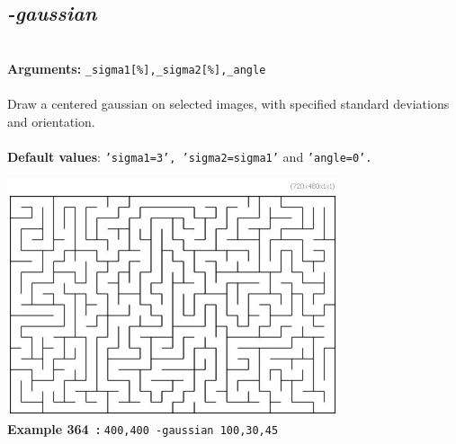 \documentclass[a4paper,11pt,twoside]{book}
\begin{document}
\subsection{\emph{-gaussian} }\vspace*{-0.5em}
~\\\textbf{Arguments: } 
{\small \texttt{\_sigma1[\%],\_sigma2[\%],\_angle}}\\~\\
Draw a centered gaussian on selected images, with specified standard deviations and orientation.
~\\~\\\textbf{Default values}: {\small \texttt{'sigma1=3', 'sigma2=sigma1'} and \texttt{'angle=0'.}}
\begin{center}\includegraphics[keepaspectratio=true,height=7cm,width=\textwidth]{img/gmic_def364.jpg}\\
{\footnotesize \textbf{Example 364~:} \texttt{400,400 -gaussian 100,30,45}}
\end{center}
\end{document}
